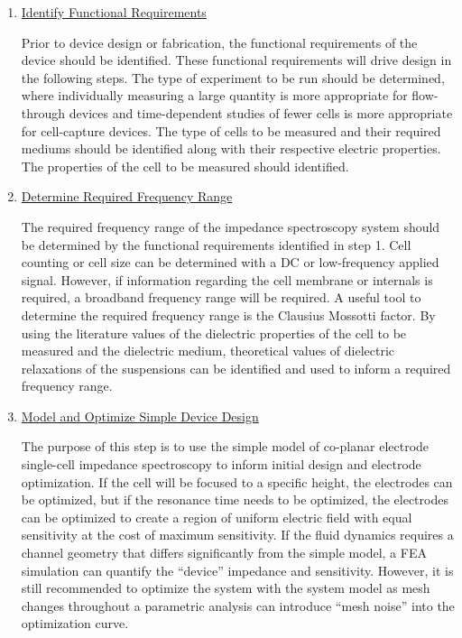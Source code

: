 \begin{enumerate}
    \item \underline{Identify Functional Requirements}
    \par Prior to device design or fabrication, the functional requirements of the device should be identified. These functional requirements will drive design in the following steps. The type of experiment to be run should be determined, where individually measuring a large quantity is more appropriate for flow-through devices and time-dependent studies of fewer cells is more appropriate for cell-capture devices. The type of cells to be measured and their required mediums should be identified along with their respective electric properties. The properties of the cell to be measured should identified.
    
    \item \underline{Determine Required Frequency Range}
    \par The required frequency range of the impedance spectroscopy system should be determined by the functional requirements identified in step 1. Cell counting or cell size can be determined with a DC or low-frequency applied signal. However, if information regarding the cell membrane or internals is required, a broadband frequency range will be required. A useful tool to determine the required frequency range is the Clausius Mossotti factor. By using the literature values of the dielectric properties of the cell to be measured and the dielectric medium, theoretical values of dielectric relaxations of the suspensions can be identified and used to inform a required frequency range.
    
    \item \underline{Model and Optimize Simple Device Design}
    \par The purpose of this step is to use the simple model of co-planar electrode single-cell impedance spectroscopy to inform initial design and electrode optimization. If the cell will be focused to a specific height, the electrodes can be optimized, but if the resonance time needs to be optimized, the electrodes can be optimized to create a region of uniform electric field with equal sensitivity at the cost of maximum sensitivity. If the fluid dynamics requires a channel geometry that differs significantly from the simple model, a FEA simulation can quantify the “device” impedance and sensitivity.  However, it is still recommended to optimize the system with the system model as mesh changes throughout a parametric analysis can introduce “mesh noise” into the optimization curve. 


\end{enumerate}
